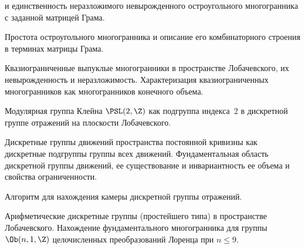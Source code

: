 \documentclass[a4paper]{article}
\begin{document}
\begin{nums}{0}
      и единственность неразложимого невырожденного остроугольного
      многогранника с заданной матрицей Грама.
\item Простота остроугольного многогранника и описание его комбинаторного
      строения в терминах матрицы Грама.
\item Квазиограниченные выпуклые многогранники в пространстве Лобачевского,
      их невырожденность и неразложимость. Характеризация
      квазиограниченных многогранников как многогранников конечного объема.
\item Модулярная группа Клейна $\PSL(2,\Z)$ как подгруппа индекса~2 в дискретной
      группе отражений на плоскости Лобачевского.
\item Дискретные группы движений пространства постоянной кривизны как
      дискретные подгруппы группы всех движений. Фундаментальная область
      дискретной группы движений, ее существование и инвариантность ее
      объема и свойства ограниченности.
\item Алгоритм для нахождения камеры дискретной группы отражений.
\item Арифметические дискретные группы (простейшего типа) в пространстве
      Лобачевского. Нахождение фундаментального многогранника для группы
      $\Ob(n,1,\Z)$ целочисленных преобразований Лоренца при $n\le9$.
\end{nums}

\medskip\dmvntrail
\end{document}
